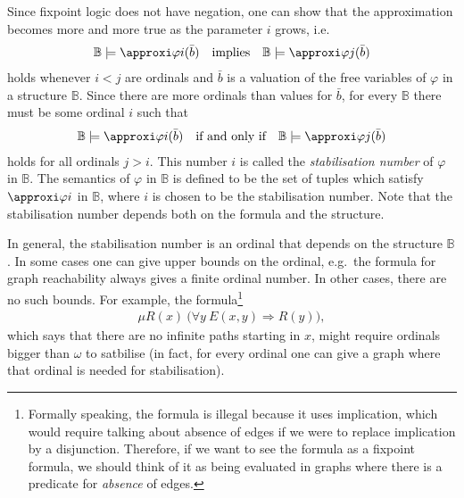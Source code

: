 Since fixpoint logic does not have negation, one can show that the approximation becomes more and more true as the parameter $i$ grows, i.e.
\begin{align*}
 \mathbb B \models \approxi \varphi i (\bar b) \quad \text{implies} \quad \mathbb B \models \approxi \varphi j (\bar b)
\end{align*}
holds whenever $i < j$ are ordinals and $\bar b$ is a valuation of the free variables of $\varphi$ in a structure $\mathbb B$. 
Since there are more ordinals than values for $\bar b$, for every $\mathbb B$ there must be some ordinal $i$ such that
\begin{align*}
 \mathbb B \models \approxi \varphi i (\bar b) \quad \text{if and only if} \quad \mathbb B \models \approxi \varphi j (\bar b) 
\end{align*}
holds for all ordinals $j > i$. 
This number $i$ is called the \emph{stabilisation number} of $\varphi$ in $\mathbb B$. The semantics of $\varphi$ in $\mathbb B$ is defined to be the set of tuples which satisfy $\approxi \varphi i$ in $\mathbb B$, where $i$ is chosen to be the stabilisation number. Note that the stabilisation number depends both on the formula and the structure. 

In general, the stabilisation number is an ordinal that depends on the structure $\mathbb B$. In some cases one can give upper bounds on the ordinal, e.g.~the formula for graph reachability always gives a finite ordinal number. In other cases, there are no such bounds. For example, the formula\footnote{Formally speaking, the formula is illegal because it uses implication, which would require talking about absence of edges if we were to replace implication by a disjunction. Therefore, if we want to see the formula as a fixpoint formula, we should think of it as being evaluated in graphs where there is a predicate for \emph{absence} of edges.}
\begin{align*}
 \mu R(x) \ \big(\forall y\ E(x,y) \Rightarrow R(y)\big),
\end{align*}
which says that there are no infinite paths starting in $x$, might require ordinals bigger than $\omega$ to satbilise (in fact, for every ordinal one can give a graph where that ordinal is needed for stabilisation). 

